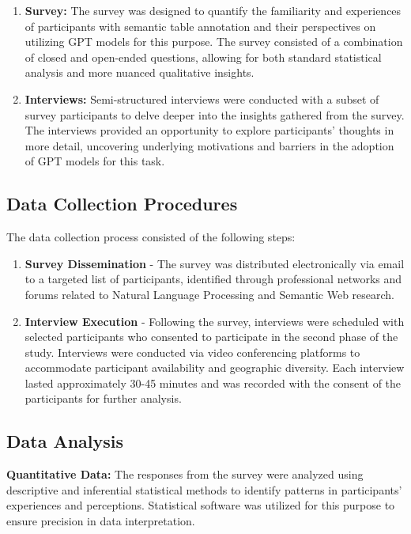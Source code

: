 \documentclass{article}
\begin{document}
\begin{enumerate}
  \item \textbf{Survey:} The survey was designed to quantify the familiarity and experiences of participants with semantic table annotation and their perspectives on utilizing GPT models for this purpose. The survey consisted of a combination of closed and open-ended questions, allowing for both standard statistical analysis and more nuanced qualitative insights.
  \item \textbf{Interviews:} Semi-structured interviews were conducted with a subset of survey participants to delve deeper into the insights gathered from the survey. The interviews provided an opportunity to explore participants’ thoughts in more detail, uncovering underlying motivations and barriers in the adoption of GPT models for this task.
\end{enumerate}

\subsection{Data Collection Procedures}

The data collection process consisted of the following steps:

\begin{enumerate}
  \item \textbf{Survey Dissemination} - The survey was distributed electronically via email to a targeted list of participants, identified through professional networks and forums related to Natural Language Processing and Semantic Web research.
  \item \textbf{Interview Execution} - Following the survey, interviews were scheduled with selected participants who consented to participate in the second phase of the study. Interviews were conducted via video conferencing platforms to accommodate participant availability and geographic diversity. Each interview lasted approximately 30-45 minutes and was recorded with the consent of the participants for further analysis.
\end{enumerate}

\subsection{Data Analysis}

\textbf{Quantitative Data:} The responses from the survey were analyzed using descriptive and inferential statistical methods to identify patterns in participants’ experiences and perceptions. Statistical software was utilized for this purpose to ensure precision in data interpretation.
\end{document}
